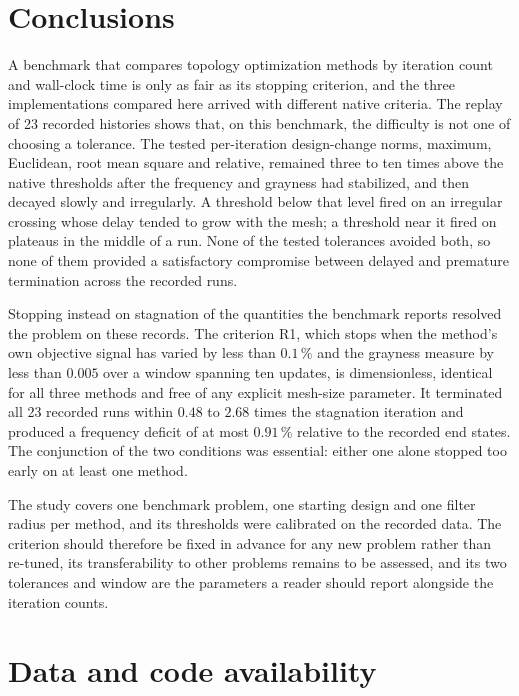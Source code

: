 \documentclass[11pt,a4paper]{article}
\begin{document}
\section{Conclusions}
\label{sec:conclusions}

A benchmark that compares topology optimization methods by iteration count and wall-clock time is only as fair as its stopping criterion, and the three implementations compared here arrived with different native criteria. The replay of 23 recorded histories shows that, on this benchmark, the difficulty is not one of choosing a tolerance. The tested per-iteration design-change norms, maximum, Euclidean, root mean square and relative, remained three to ten times above the native thresholds after the frequency and grayness had stabilized, and then decayed slowly and irregularly. A threshold below that level fired on an irregular crossing whose delay tended to grow with the mesh; a threshold near it fired on plateaus in the middle of a run. None of the tested tolerances avoided both, so none of them provided a satisfactory compromise between delayed and premature termination across the recorded runs.

Stopping instead on stagnation of the quantities the benchmark reports resolved the problem on these records. The criterion R1, which stops when the method's own objective signal has varied by less than $0.1\,\%$ and the grayness measure by less than $0.005$ over a window spanning ten updates, is dimensionless, identical for all three methods and free of any explicit mesh-size parameter. It terminated all 23 recorded runs within $0.48$ to $2.68$ times the stagnation iteration and produced a frequency deficit of at most $0.91\,\%$ relative to the recorded end states. The conjunction of the two conditions was essential: either one alone stopped too early on at least one method.

The study covers one benchmark problem, one starting design and one filter radius per method, and its thresholds were calibrated on the recorded data. The criterion should therefore be fixed in advance for any new problem rather than re-tuned, its transferability to other problems remains to be assessed, and its two tolerances and window are the parameters a reader should report alongside the iteration counts.

\section*{Data and code availability}
\end{document}
